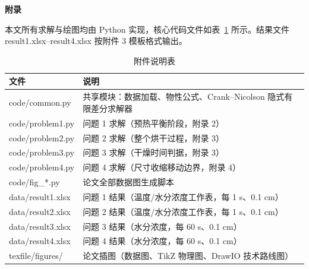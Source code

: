 \newpage
\appendix
\begin{center}
	{\bfseries 附录}
\end{center}

本文所有求解与绘图均由 Python 实现，核心代码文件如表~\ref{tab:appendix} 所示。结果文件 result1.xlsx--result4.xlsx 按附件 3 模板格式输出。

\begin{table}[htbp]
	\caption{附件说明表}
	\label{tab:appendix}
	\centering
	\begin{tabular}{ll}
		\toprule
		文件 & 说明 \\
		\midrule
		code/common.py & 共享模块：数据加载、物性公式、Crank--Nicolson 隐式有限差分求解器 \\
		code/problem1.py & 问题 1 求解（预热平衡阶段，附录 2） \\
		code/problem2.py & 问题 2 求解（整个烘干过程，附录 3） \\
		code/problem3.py & 问题 3 求解（干燥时间判据，附录 3） \\
		code/problem4.py & 问题 4 求解（尺寸收缩移动边界，附录 4） \\
		code/fig\_*.py & 论文全部数据图生成脚本 \\
		data/result1.xlsx & 问题 1 结果（温度/水分浓度工作表，每 1 s、0.1 cm） \\
		data/result2.xlsx & 问题 2 结果（温度/水分浓度工作表，每 1 s、0.1 cm） \\
		data/result3.xlsx & 问题 3 结果（水分浓度，每 60 s、0.1 cm） \\
		data/result4.xlsx & 问题 4 结果（水分浓度，每 60 s、0.1 cm） \\
		texfile/figures/ & 论文插图（数据图、TikZ 物理图、DrawIO 技术路线图） \\
		\bottomrule
	\end{tabular}
\end{table}
